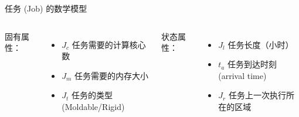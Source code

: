 \begin{frame}{任务 (Job) 的数学模型}

    \begin{columns}


        固有属性：

        \begin{itemize}
            \item $J_c$ 任务需要的计算核心数
            \item $J_m$ 任务需要的内存大小
            \item $J_t$ 任务的类型 (Moldable/Rigid)
        \end{itemize}


        状态属性：

        \begin{itemize}
            \item $J_l$ 任务长度（小时）
            \item $t_a$ 任务到达时刻 (arrival time)
            \item $J_r$ 任务上一次执行所在的区域
        \end{itemize}

    \end{columns}

\end{frame}

